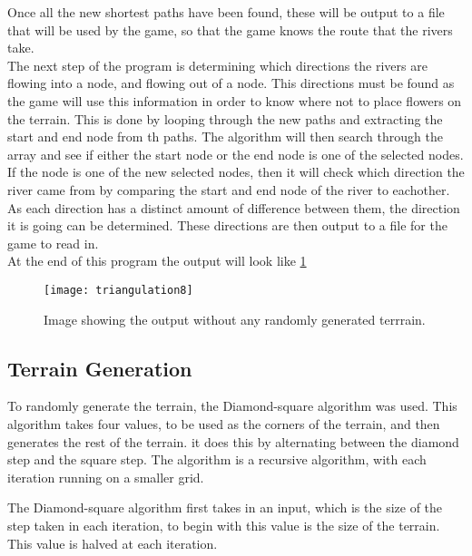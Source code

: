 
	Once all the new shortest paths have been found, these will be output to a file that will be used by the game, so that the game knows the route that the rivers take.\\
	The next step of the program is determining which directions the rivers are flowing into a node, and flowing out of a node. This directions must be found as the game will use this information in order to know where not to place flowers on the terrain. This is done by looping through the new paths and extracting the start and end node from th paths. The algorithm will then search through the array and see if either the start node or the end node is one of the selected nodes. If the node is one of the new selected nodes, then it will check which direction the river came from by comparing the start and end node of the river to eachother. As each direction has a distinct amount of difference between them, the direction it is going can be determined. These directions are then output to a file for the game to read in.\\


	At the end of this program the output will look like \ref{fig:triangulation8}

\begin{figure}[H]
	\texttt{[image: triangulation8]}
	\centering
	\caption{Image showing the output without any randomly generated terrrain.}
	\label{fig:triangulation8}
\end{figure}


\subsection{Terrain Generation}
	To randomly generate the terrain, the Diamond-square algorithm was used. This algorithm takes four values, to be used as the corners of the terrain, and then generates the rest of the terrain. it does this by alternating between the diamond step and the square step. The algorithm is a recursive algorithm, with each iteration running on a smaller grid.
	\newline
	\par
	The Diamond-square algorithm first takes in an input, which is the size of the step taken in each iteration, to begin with this value is the size of the terrain. This value is halved at each iteration.\\

